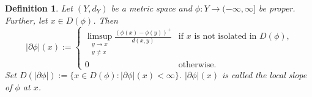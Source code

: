 \documentclass[a4paper,11pt, leqno]{scrreprt} %
\theoremstyle{change}
\newcounter{acounter}[chapter]
\newtheorem{definition}[acounter]{Definition}
\theoremstyle{nonumberplain}
\begin{document}
\begin{definition}
  Let $(Y, d_Y)$ be a metric space and $\phi : Y \to (-\infty,
  \infty]$ be proper. Further, let $x \in D(\phi)$. Then
  \begin{equation}
    \label{eq:ms_def_1_1}
    |\partial \phi|(x) :=
    \begin{cases}
      \displaystyle \limsup_{\substack{y \to x \\ y \neq x}} \frac{(\phi(x) -
        \phi(y))^+}{d(x,y)} & \text{if $x$ is not isolated in
        $D(\phi)$,}\\
      0 &\text{otherwise.}
    \end{cases}
  \end{equation}
  Set $D(|\partial \phi|) := \{x \in D(\phi) : |\partial \phi|(x) <
  \infty\}$. $|\partial \phi|(x)$ is called the \textit{local slope of
    $\phi$ at $x$}.
\end{definition}
\end{document}
